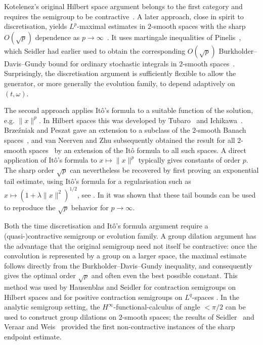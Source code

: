 \documentclass[11pt]{amsart}
\theoremstyle{definition}
\theoremstyle{remark}
\numberwithin{equation}{section}
\newcommand{\1}{\mathbf 1}
\newcommand{\norm}[1]{\lVert #1\rVert}
\begin{document}
Kotelenez's original Hilbert space argument belongs to the first category
and requires the semigroup to be contractive~\cite{Kotelenez1982}.  A later
approach, close in spirit to discretisation, yields \(L^p\)-maximal
estimates in \(2\)-smooth spaces with the sharp \(O(\sqrt p)\) dependence
as \(p\to\infty\)~\cite{vanNeervenVeraar2022}.  It uses martingale
inequalities of Pinelis~\cite{Pinelis}, which Seidler had earlier used to
obtain the corresponding \(O(\sqrt p)\) Burkholder--Davis--Gundy bound for
ordinary stochastic integrals in \(2\)-smooth spaces~\cite{Sei10}.  Surprisingly, the
discretisation argument is sufficiently flexible to allow the generator,
or more generally the evolution family, to depend adaptively on
\((t,\omega)\).

The second approach applies It\^o's formula to a suitable function of the
solution, e.g. $\|x\|^p$.  In Hilbert spaces this was developed by Tubaro~\cite{Tubaro1984}
and Ichikawa~\cite{Ichikawa1986}.  Brze\'zniak and Peszat gave an
extension to a subclass of the  \(2\)-smooth Banach spaces~\cite{BrzezniakPeszat2000}, and
van Neerven and Zhu subsequently obtained the result for all \(2\)-smooth
spaces~\cite{vanNeervenZhu2011} by an extension of the It\^o formula to all such spaces. A direct application of It\^o's formula
to \(x\mapsto\norm{x}^p\) typically gives constants of order \(p\).  The
sharp order \(\sqrt p\) can nevertheless be recovered by first proving an exponential
tail estimate, using It\^o's formula for a regularisation such as
\(x\mapsto(1+\lambda\norm{x}^2)^{1/2}\), see
\cite{BrzezniakPeszat2000,vanNeervenVeraar2022}. In \cite{coxvw2024sharp} it was shown that these tail bounds can be used to reproduce the $\sqrt{p}$ behavior for $p\to \infty$. 

Both the time discretisation and It\^o's formula argument require a (quasi-)contractive
semigroup or evolution family. A group dilation argument has the advantage that the original semigroup need not itself be contractive: once the convolution is represented by a group on a larger space, the
maximal estimate follows directly from the 
Burkholder--Davis--Gundy inequality, and consequently gives the optimal order \(\sqrt p\) and often even the best possible constant.  This method was used by Hausenblas and Seidler for contraction semigroups on
Hilbert spaces and for positive contraction semigroups on \(L^q\)-spaces
\cite{HausenblasSeidler2001,HausenblasSeidler2008}.  In the analytic semigroup setting, the $H^\infty$-functional-calculus of angle $<\pi/2$ can be used to construct group 
dilations on \(2\)-smooth spaces; the results of Seidler~\cite{Sei10} and
Veraar and Weis~\cite{VeraarWeis2011} provided the first non-contractive
instances of the sharp endpoint estimate. 
\end{document}
